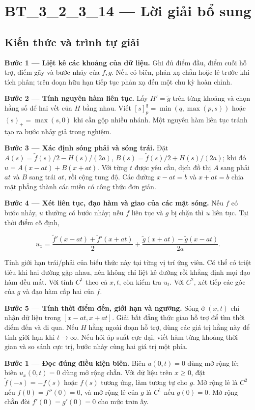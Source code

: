 \documentclass[10pt,a4paper]{article}
\begin{document}
\section*{BT\_3\_2\_3\_14 — Lời giải bổ sung}
\subsection*{Kiến thức và trình tự giải}
\textbf{Bước 1 — Liệt kê các khoảng của dữ liệu.} Ghi đủ điểm đầu, điểm cuối hỗ trợ, điểm gãy và bước nhảy của $f,g$. Nếu có biên, phản xạ chẵn hoặc lẻ trước khi tích phân; trên đoạn hữu hạn tiếp tục phản xạ đến một chu kỳ hoàn chỉnh.

\textbf{Bước 2 — Tính nguyên hàm liên tục.} Lấy $H'=\widetilde g$ trên từng khoảng và chọn hằng số để hai vết của $H$ bằng nhau. Viết $[s]_p^q=\min(q,\max(p,s))$ hoặc $(s)_+=\max(s,0)$ khi cần gộp nhiều nhánh. Một nguyên hàm liên tục tránh tạo ra bước nhảy giả trong nghiệm.

\textbf{Bước 3 — Xác định sóng phải và sóng trái.} Đặt $A(s)=\widetilde f(s)/2-H(s)/(2a)$, $B(s)=\widetilde f(s)/2+H(s)/(2a)$; khi đó $u=A(x-at)+B(x+at)$. Với từng $t$ được yêu cầu, dịch đồ thị $A$ sang phải $at$ và $B$ sang trái $at$, rồi cộng tung độ. Các đường $x-at=b$ và $x+at=b$ chia mặt phẳng thành các miền có công thức đơn giản.

\textbf{Bước 4 — Xét liên tục, đạo hàm và giao của các mặt sóng.} Nếu $f$ có bước nhảy, $u$ thường có bước nhảy; nếu $f$ liên tục và $g$ bị chặn thì $u$ liên tục. Tại thời điểm cố định,


\[
u_x=\frac{\widetilde f'(x-at)+\widetilde f'(x+at)}2+\frac{\widetilde g(x+at)-\widetilde g(x-at)}{2a}.
\]


Tính giới hạn trái/phải của biểu thức này tại từng vị trí ứng viên. Có thể có triệt tiêu khi hai đường gặp nhau, nên không chỉ liệt kê đường rồi khẳng định mọi đạo hàm đều mất. Với tính $C^1$ theo cả $x,t$, còn kiểm tra $u_t$. Với $C^2$, xét tiếp các góc của $g$ và đạo hàm cấp hai của $f$.

\textbf{Bước 5 — Tính thời điểm đến, giới hạn và ngưỡng.} Sóng ở $(x,t)$ chỉ nhận dữ liệu trong $[x-at,x+at]$. Giải bất đẳng thức giao hỗ trợ để tìm thời điểm đến và đi qua. Nếu $H$ hằng ngoài đoạn hỗ trợ, dùng các giá trị hằng này để tính giới hạn khi $t\to\infty$. Nếu hỏi áp suất cực đại, viết hàm từng khoảng thời gian và so sánh cực trị, bước nhảy cùng hai giá trị một phía.

\textbf{Bước 1 — Đọc đúng điều kiện biên.} Biên $u(0,t)=0$ dùng mở rộng lẻ; biên $u_x(0,t)=0$ dùng mở rộng chẵn. Với dữ liệu trên $x\ge0$, đặt $\widetilde f(-s)=-f(s)$ hoặc $f(s)$ tương ứng, làm tương tự cho $g$. Mở rộng lẻ là $C^2$ nếu $f(0)=f''(0)=0$, và mở rộng lẻ của $g$ là $C^1$ nếu $g(0)=0$. Mở rộng chẵn đòi $f'(0)=g'(0)=0$ cho mức trơn ấy.
\end{document}
